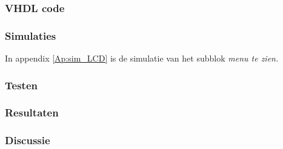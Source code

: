\subsubsection{VHDL code}

\subsubsection{Simulaties}
In appendix \ref{Ap:sim_LCD} is de simulatie van het subblok \it{menu} te zien.

\subsubsection{Testen}

\subsubsection{Resultaten}

\subsubsection{Discussie}